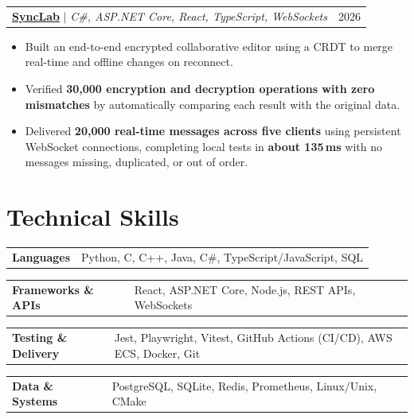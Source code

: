 \documentclass[letterpaper,11pt]{article}
\makeatletter
\newcommand{\resumelink}[2]{\href{#1}{\underline{#2}}}
\newcommand{\resumeProjectHeading}[3]{%
  \begin{tabular*}{\textwidth}{l@{\extracolsep{\fill}}r}
    \small\textbf{#1} $|$ \textit{#2} & \small #3 \\
  \end{tabular*}\vspace{1pt}
}
\newenvironment{resumeItems}{%
  \begin{itemize}[leftmargin=0.18in,label=\textbullet,
    itemsep=1pt,topsep=1pt,parsep=0pt,partopsep=0pt]\small
}{\end{itemize}\vspace{0pt}}
\newcommand{\resumeItem}[1]{\item #1}
\newcommand{\resumeSkillRow}[2]{%
  \begin{tabularx}{\textwidth}{@{}>{\bfseries}l >{\raggedleft\arraybackslash}X@{}}
    #1 & #2
  \end{tabularx}\vspace{-2pt}%
}
\makeatother
\begin{document}
\resumeProjectHeading
  {\resumelink{https://github.com/EesherJ39/SyncLab}{SyncLab}}
  {C\#, ASP.NET Core, React, TypeScript, WebSockets}{2026}
\begin{resumeItems}
  \resumeItem{Built an end-to-end encrypted collaborative editor using a CRDT to merge real-time and of{}f{}line changes on reconnect.}
  \resumeItem{Verif{}ied \textbf{30,000 encryption and decryption operations with zero mismatches} by automatically comparing each result with the original data.}
  \resumeItem{Delivered \textbf{20,000 real-time messages across f{}ive clients} using persistent WebSocket connections, completing local tests in \textbf{about 135\,ms} with no messages missing, duplicated, or out of order.}
\end{resumeItems}

\section{Technical Skills}
{\small
  \resumeSkillRow{Languages}{Python, C, C++, Java, C\#, TypeScript/JavaScript, SQL}
  \resumeSkillRow{Frameworks \& APIs}{React, ASP.NET Core, Node.js, REST APIs, WebSockets}
  \resumeSkillRow{Testing \& Delivery}{Jest, Playwright, Vitest, GitHub Actions (CI/CD), AWS ECS, Docker, Git}
  \resumeSkillRow{Data \& Systems}{PostgreSQL, SQLite, Redis, Prometheus, Linux/Unix, CMake}
}
\end{document}
